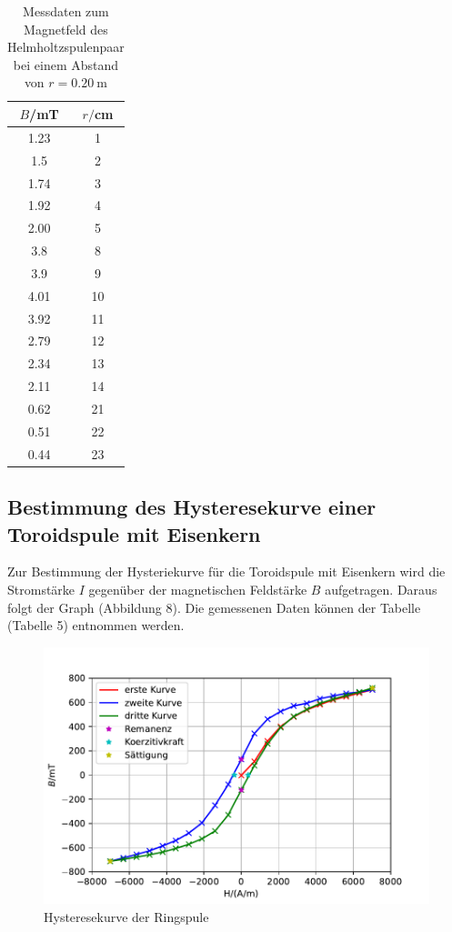 \documentclass[
  bibliography=totoc,     %
  captions=tableheading,  %
  titlepage=firstiscover, %
]{scrartcl}
\begin{document}
  \FloatBarrier

  \begin{table}
    \centering
    \caption{Messdaten zum Magnetfeld des Helmholtzspulenpaar 
      bei einem Abstand von $r=\SI{0.20}{\metre}$}
    \label{tab:helmholtz3}
    \begin{tabular}{c c}
      \toprule
      $B$/mT & $r/$cm\\
      \midrule
      1.23 & 1\\
      1.5 & 2\\
      1.74 & 3\\
      1.92 & 4\\
      2.00 & 5\\
      3.8 & 8\\
      3.9 & 9\\
      4.01 & 10\\
      3.92 & 11\\
      2.79 & 12\\
      2.34 & 13\\
      2.11 & 14\\
      0.62 & 21\\
      0.51 & 22\\
      0.44 & 23\\

      \bottomrule
    \end{tabular}
  \end{table}

  \FloatBarrier

  \newpage
  \subsection{Bestimmung des Hysteresekurve einer Toroidspule mit Eisenkern}

  Zur Bestimmung der Hysteriekurve für die Toroidspule mit Eisenkern
  wird die Stromstärke $I$ gegenüber der magnetischen Feldstärke $B$ aufgetragen.
  Daraus folgt der Graph (Abbildung 8). Die gemessenen Daten können 
  der Tabelle (Tabelle 5) entnommen werden.

  \begin{figure}
    \centering
    \includegraphics{plot5.pdf}
    \caption{Hysteresekurve der Ringspule}
    \label{fig:hysterese1}
  \end{figure}
\end{document}
